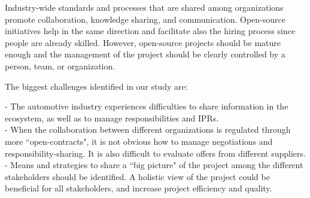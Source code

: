 Industry-wide standards and processes that are shared among organizations promote collaboration, knowledge sharing, and communication. Open-source initiatives help in the same direction and facilitate also the hiring process since people are already skilled. However, open-source projects should be mature enough and the management of the project should be clearly controlled by a person, team, or organization.



\noindent The biggest challenges identified in our study are: 

 - The automotive industry experiences difficulties to share information in the ecosystem, as well as to manage responsibilities and IPRs. \\
 - When the collaboration between different organizations is regulated through more ``open-contracts", it is not obvious  how to manage negotiations and responsibility-sharing. It is also difficult to evaluate offers from different suppliers.\\ %
 -  Means and strategies to share a ``big picture" of the project among the different stakeholders should be identified. A holistic view of the project could be beneficial for all stakeholders, and increase project efficiency and quality. 




